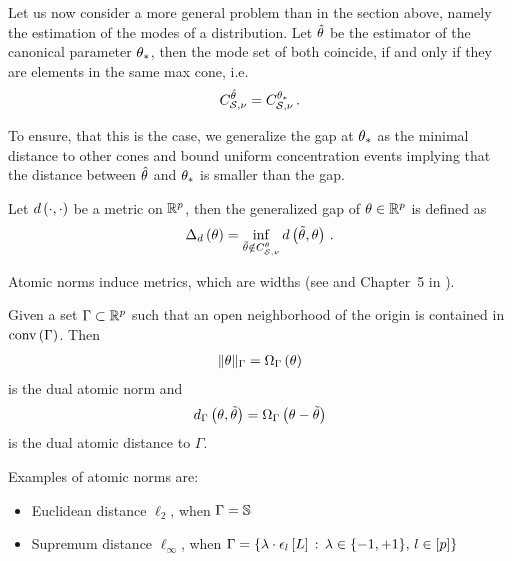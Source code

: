 
Let us now consider a more general problem than in the section above, namely the estimation of the modes of a distribution.
Let $\hat{\theta}$ be the estimator of the canonical parameter $\theta_{*}$, then the mode set of both coincide, if and only if they are elements in the same max cone, i.e.
\begin{align*}
    C_{\mathcal{S},\nu}^{\hat{\theta}} = C_{\mathcal{S},\nu}^{\theta_{*}} \, .
\end{align*}

To ensure, that this is the case, we generalize the gap at $\theta_{*}$ as the minimal distance to other cones and bound uniform concentration events implying that the distance between $\hat{\theta}$ and $\theta_{*}$ is smaller than the gap.

\begin{definition}
    Let $d\left(\cdot,\cdot\right)$ be a metric on $\mathbb{R}^{p}$, then the generalized gap of $\theta\in\mathbb{R}^{p}$ is defined as
    \begin{align*}
        \Delta_{d}\left(\theta\right) = \inf_{\tilde{\theta}\notin C_{\mathcal{S},\nu}^{\theta}} d\left(\tilde{\theta},\theta\right) \, .
    \end{align*}
\end{definition}

Atomic norms induce metrics, which are widths (see \cite{chandrasekaran_convex_2012} and Chapter~5 in \cite{goesmann_uniform_2021}).

\begin{definition}
    Given a set $\Gamma\subset\mathbb{R}^{p}$ such that an open neighborhood of the origin is contained in $\mathrm{conv}\left(\Gamma\right)$.
    Then
    \begin{align*}
        \|\theta\|_{\Gamma} = \Omega_{\Gamma}\left(\theta\right)
    \end{align*}
    is the dual atomic norm and
    \begin{align*}
        d_{\Gamma}\left(\theta,\tilde{\theta}\right) = \Omega_{\Gamma}\left(\theta-\tilde{\theta}\right)
    \end{align*}
    is the dual atomic distance to $\Gamma$.
\end{definition}

Examples of atomic norms are:
\begin{itemize}
    \item Euclidean distance $\ell_2$, when $\Gamma=\mathbb{S}$
    \item Supremum distance $\ell_{\infty}$, when $\Gamma=\{\lambda\cdot \epsilon_{l}\left[L\right] \,:\, \lambda\in\{-1,+1\},\, l\in[p]\}$
\end{itemize}


